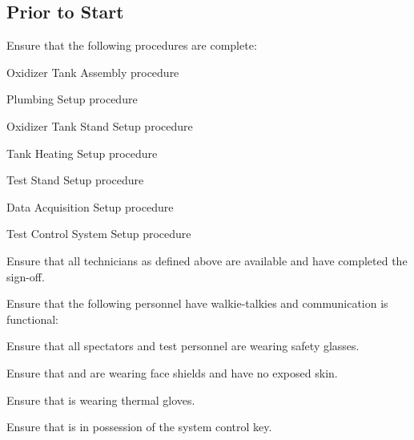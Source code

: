 \newpage
\subsection{Prior to Start}
\begin{checklist}
    \item Ensure that the following procedures are complete:
    \begin{checklist}
        \item Oxidizer Tank Assembly procedure
        \item Plumbing Setup procedure
        \item Oxidizer Tank Stand Setup procedure
        \item Tank Heating Setup procedure
        \item Test Stand Setup procedure
        \item Data Acquisition Setup procedure
        \item Test Control System Setup procedure
    \end{checklist}
    \item Ensure that all technicians as defined above are available and have completed the sign-off.
    \item Ensure that the following personnel have walkie-talkies and communication is functional:
    \begin{checklist}
        \item \ops{}
        \item \secondary
        \item \daq{}
        \item \heat
        \item \peri{}
        \item \perii{}
    \end{checklist}
    \item Ensure that all spectators and test personnel are wearing safety glasses.
    \item Ensure that \primary{} and \secondary are wearing face shields and have no exposed skin.
    \item Ensure that \primary{} is wearing thermal gloves.
    \item Ensure that \secondary is in possession of the system control key.
\end{checklist}
\setcounter{checklistnum}{0}

\newpage
